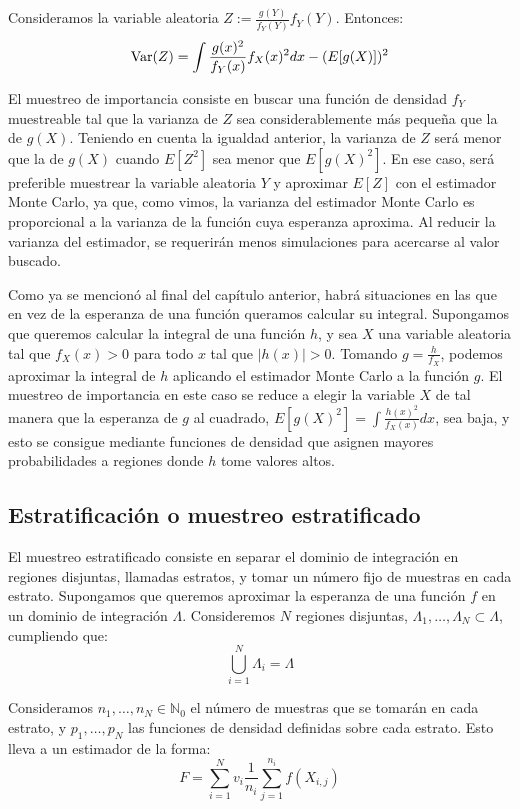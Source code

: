 Consideramos la variable aleatoria $Z:=\frac{g(Y)}{f_Y(Y)}f_Y(Y)$. Entonces:
$$\mathrm{Var}(Z) = \int \frac{g(x)^2}{f_Y(x)}f_X(x)^2dx - (E[g(X)])^2$$

El muestreo de importancia consiste en buscar una función de densidad $f_Y$ muestreable tal que la varianza de $Z$ sea considerablemente más pequeña que la de $g(X)$. Teniendo en cuenta la igualdad anterior, la varianza de $Z$ será menor que la de $g(X)$ cuando $E[Z^2]$ sea menor que $E[g(X)^2]$. En ese caso, será preferible muestrear la variable aleatoria $Y$ y aproximar $E[Z]$ con el estimador Monte Carlo, ya que, como vimos, la varianza del estimador Monte Carlo es proporcional a la varianza de la función cuya esperanza aproxima. Al reducir la varianza del estimador, se requerirán menos simulaciones para acercarse al valor buscado.

Como ya se mencionó al final del capítulo anterior, habrá situaciones en las que en vez de la esperanza de una función queramos calcular su integral. Supongamos que queremos calcular la integral de una función $h$, y sea $X$ una variable aleatoria tal que $f_X(x)>0$ para todo $x$ tal que $|h(x)|>0$. Tomando $g = \frac{h}{f_X}$, podemos aproximar la integral de $h$ aplicando el estimador Monte Carlo a la función $g$. El muestreo de importancia en este caso se reduce a elegir la variable $X$ de tal manera que la esperanza de $g$ al cuadrado, $E[g(X)^2]= \int \frac{h(x)^2}{f_X(x)}dx$, sea baja, y esto se consigue mediante funciones de densidad que asignen mayores probabilidades a regiones donde $h$ tome valores altos.

\subsection{Estratificación o muestreo estratificado}

El muestreo estratificado consiste en separar el dominio de integración en regiones disjuntas, llamadas estratos, y tomar un número fijo de muestras en cada estrato. Supongamos que queremos aproximar la esperanza de una función $f$ en un dominio de integración $\Lambda$. Consideremos $N$ regiones disjuntas, $\Lambda_1,\ldots,\Lambda_N\subset \Lambda$, cumpliendo que:
$$\bigcup_{i=1}^N\Lambda_i = \Lambda$$

Consideramos $n_1,\ldots,n_N \in\mathds{N}_0$ el número de muestras que se tomarán en cada estrato, y $p_1,\ldots,p_N$ las funciones de densidad definidas sobre cada estrato. Esto lleva a un estimador de la forma:
$$F = \sum_{i=1}^N v_i\frac{1}{n_i}\sum_{j=1}^{n_i}f(X_{i,j})$$

